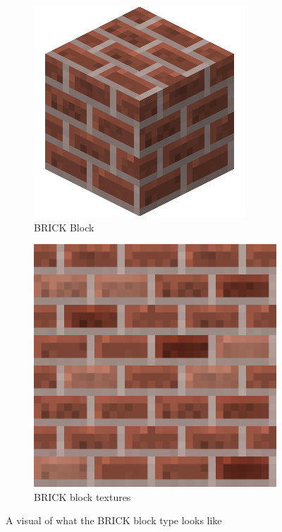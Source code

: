 \documentclass[12pt, titlepage]{article}
\begin{document}
\begin{figure}[!tbp]
  \begin{subfigure}[b]{0.3\textwidth}
    \includegraphics[width=\textwidth]{BrickBlock.png}
    \caption{BRICK Block}
    \label{fig:f1}
  \end{subfigure}
  \hfill
  \begin{subfigure}[b]{0.3\textwidth}
    \includegraphics[width=\textwidth]{BrickTexture.png}
    \caption{BRICK block textures}
    \label{fig:f2}
  \end{subfigure}
  \caption{A visual of what the BRICK block type looks like}
\end{figure}
\end{document}
